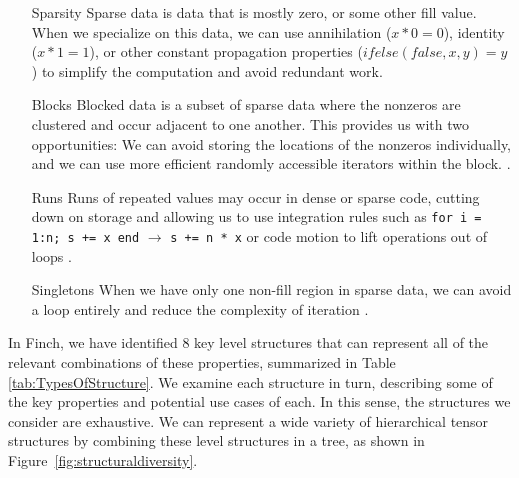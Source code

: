     \begin{enumerate}
        \item[Sparsity] Sparse data is data that is mostly zero, or some other
        fill value. When we specialize on this data, we can use annihilation ($x
        * 0 = 0$), identity ($x * 1 = 1$), or other constant propagation
        properties ($ifelse(false, x, y) = y$) to simplify the computation and avoid
        redundant work.
        
        \item[Blocks] Blocked data is a subset of sparse data where the nonzeros
        are clustered and occur adjacent to one another. This provides us with
        two opportunities: We can avoid storing the locations of the nonzeros
        individually, and we can use more efficient randomly accessible
        iterators within the block. \cite{im_optimizing_2001, vuduc_performance_2002, ahrens_looplets_2023}.

        \item[Runs] Runs of repeated values may occur in dense or sparse code,
        cutting down on storage and allowing us to use integration rules such as 
        \texttt{for i = 1:n; s += x end} $\rightarrow$
        \texttt{s += n * x} or code motion to lift operations out of loops \cite{donenfeld_unified_2022,ahrens_looplets_2023}.

        \item[Singletons] When we have only one non-fill region in sparse data,
        we can avoid a loop entirely and reduce the complexity of iteration \cite{ghorbani2023compiling, ahrens_looplets_2023}.
    \end{enumerate}

    In Finch, we have identified 8 key level structures that can represent all
    of the relevant combinations of these properties, summarized in Table
    \ref{tab:TypesOfStructure}. We examine each structure in turn, describing
    some of the key properties and potential use cases of each. In this sense,
    the structures we consider are exhaustive. We can represent a wide variety
    of hierarchical tensor structures by combining these level structures in a
    tree, as shown in Figure~\ref{fig:structuraldiversity}.

